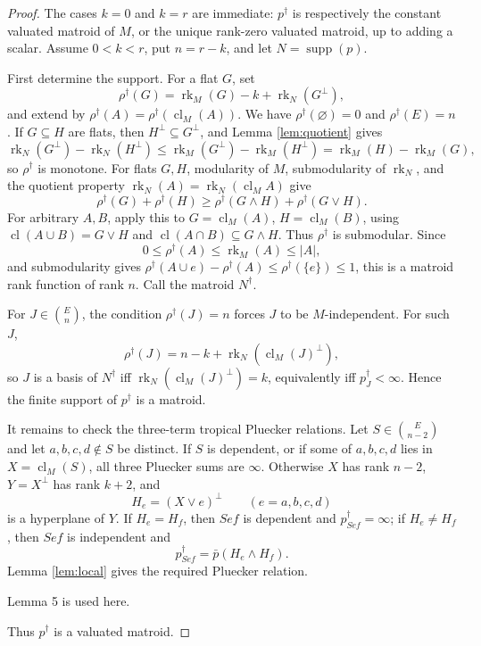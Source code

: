 \documentclass[12pt]{article}
\theoremstyle{definition}
\newcommand{\rk}{\operatorname{rk}}
\newcommand{\cl}{\operatorname{cl}}
\newcommand{\supp}{\operatorname{supp}}
\newcommand{\binomE}[1]{\binom{E}{#1}}
\newcommand{\review}[1]{\begin{reviewbox}#1\end{reviewbox}}
\begin{document}
\begin{proof}
The cases \(k=0\) and \(k=r\) are immediate: \(p^\dagger\) is respectively the constant valuated matroid of \(M\), or the unique rank-zero valuated matroid, up to adding a scalar.  Assume \(0<k<r\), put \(n=r-k\), and let \(N=\supp(p)\).

First determine the support.  For a flat \(G\), set
\[
\rho^\dagger(G)=\rk_M(G)-k+\rk_N(G^\perp),
\]
and extend by \(\rho^\dagger(A)=\rho^\dagger(\cl_M(A))\).  We have \(\rho^\dagger(\varnothing)=0\) and \(\rho^\dagger(E)=n\).  If \(G\subseteq H\) are flats, then \(H^\perp\subseteq G^\perp\), and Lemma \ref{lem:quotient} gives
\[
\rk_N(G^\perp)-\rk_N(H^\perp)\le \rk_M(G^\perp)-\rk_M(H^\perp)=\rk_M(H)-\rk_M(G),
\]
so \(\rho^\dagger\) is monotone.  For flats \(G,H\), modularity of \(M\), submodularity of \(\rk_N\), and the quotient property
\(\rk_N(A)=\rk_N(\cl_M A)\) give
\[
\rho^\dagger(G)+\rho^\dagger(H)\ge
\rho^\dagger(G\wedge H)+\rho^\dagger(G\vee H).
\]
For arbitrary \(A,B\), apply this to \(G=\cl_M(A)\), \(H=\cl_M(B)\), using \(\cl(A\cup B)=G\vee H\) and \(\cl(A\cap B)\subseteq G\wedge H\).  Thus \(\rho^\dagger\) is submodular.  Since
\[
0\le \rho^\dagger(A)\le \rk_M(A)\le |A|,
\]
and submodularity gives \(\rho^\dagger(A\cup e)-\rho^\dagger(A)\le\rho^\dagger(\{e\})\le 1\), this is a matroid rank function of rank \(n\).  Call the matroid \(N^\dagger\).

For \(J\in\binomE n\), the condition \(\rho^\dagger(J)=n\) forces \(J\) to be \(M\)-independent.  For such \(J\),
\[
\rho^\dagger(J)=n-k+\rk_N(\cl_M(J)^\perp),
\]
so \(J\) is a basis of \(N^\dagger\) iff \(\rk_N(\cl_M(J)^\perp)=k\), equivalently iff \(p^\dagger_J<\infty\).  Hence the finite support of \(p^\dagger\) is a matroid.

It remains to check the three-term tropical Pluecker relations.  Let \(S\in\binomE{n-2}\) and let \(a,b,c,d\notin S\) be distinct.  If \(S\) is dependent, or if some of \(a,b,c,d\) lies in \(X=\cl_M(S)\), all three Pluecker sums are \(\infty\).  Otherwise \(X\) has rank \(n-2\), \(Y=X^\perp\) has rank \(k+2\), and
\[
H_e=(X\vee e)^\perp\qquad(e=a,b,c,d)
\]
is a hyperplane of \(Y\).  If \(H_e=H_f\), then \(Sef\) is dependent and \(p^\dagger_{Sef}=\infty\); if \(H_e\ne H_f\), then \(Sef\) is independent and
\[
p^\dagger_{Sef}=\bar p(H_e\wedge H_f).
\]
Lemma \ref{lem:local} gives the required Pluecker relation. \review{Lemma 5 is used here.} Thus \(p^\dagger\) is a valuated matroid.


\end{proof}
\end{document}
